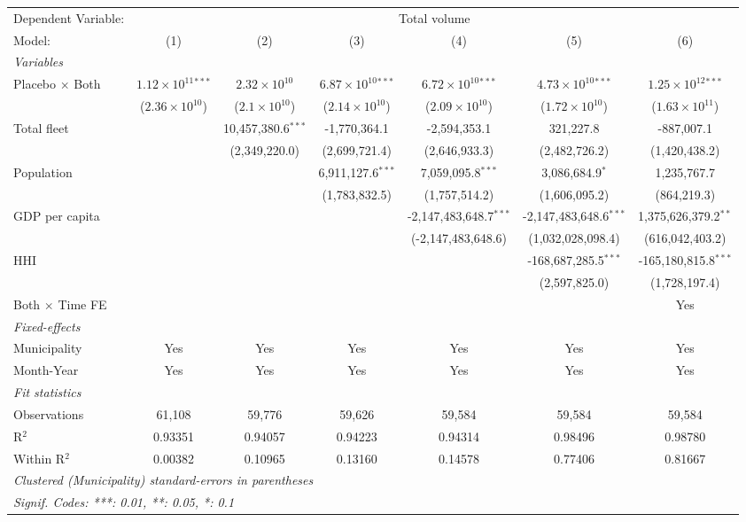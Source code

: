 \documentclass[
]{article}
\begin{document}
\begin{tabular}{lcccccc}
\tabularnewline\midrule\midrule
Dependent Variable:&\multicolumn{6}{c}{Total volume}\\
Model:&(1) & (2) & (3) & (4) & (5) & (6)\\
\midrule \emph{Variables}&   &   &   &   &   &  \\
Placebo $\times $ Both & $1.12\times 10^{11}$$^{***}$ & $2.32\times 10^{10}$ & $6.87\times 10^{10}$$^{***}$ & $6.72\times 10^{10}$$^{***}$ & $4.73\times 10^{10}$$^{***}$ & $1.25\times 10^{12}$$^{***}$\\
  &($2.36\times 10^{10}$) & ($2.1\times 10^{10}$) & ($2.14\times 10^{10}$) & ($2.09\times 10^{10}$) & ($1.72\times 10^{10}$) & ($1.63\times 10^{11}$)\\
Total fleet &    & 10,457,380.6$^{***}$ & -1,770,364.1 & -2,594,353.1 & 321,227.8 & -887,007.1\\
  &   & (2,349,220.0) & (2,699,721.4) & (2,646,933.3) & (2,482,726.2) & (1,420,438.2)\\
Population &    &    & 6,911,127.6$^{***}$ & 7,059,095.8$^{***}$ & 3,086,684.9$^{*}$ & 1,235,767.7\\
  &   &    & (1,783,832.5) & (1,757,514.2) & (1,606,095.2) & (864,219.3)\\
GDP per capita &    &    &    & -2,147,483,648.7$^{***}$ & -2,147,483,648.6$^{***}$ & 1,375,626,379.2$^{**}$\\
  &   &    &    & (-2,147,483,648.6) & (1,032,028,098.4) & (616,042,403.2)\\
HHI &    &    &    &    & -168,687,285.5$^{***}$ & -165,180,815.8$^{***}$\\
  &   &    &    &    & (2,597,825.0) & (1,728,197.4)\\
Both $\times$ Time FE &  &  &  &  &  & Yes\\
\midrule \emph{Fixed-effects}&   &   &   &   &   &  \\
Municipality & Yes & Yes & Yes & Yes & Yes & Yes\\
Month-Year & Yes & Yes & Yes & Yes & Yes & Yes\\
\midrule \emph{Fit statistics}&  & & & & & \\
Observations & 61,108&59,776&59,626&59,584&59,584&59,584\\
R$^2$ & 0.93351&0.94057&0.94223&0.94314&0.98496&0.98780\\
Within R$^2$ & 0.00382&0.10965&0.13160&0.14578&0.77406&0.81667\\
\midrule\midrule\multicolumn{7}{l}{\emph{Clustered (Municipality) standard-errors in parentheses}}\\
\multicolumn{7}{l}{\emph{Signif. Codes: ***: 0.01, **: 0.05, *: 0.1}}\\
\end{tabular}
\end{document}
